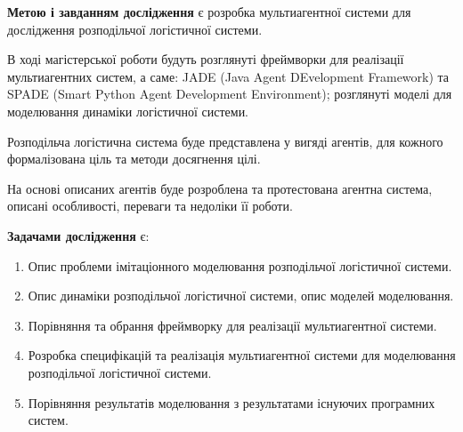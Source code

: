 \textbf{Метою і завданням дослідження} є розробка мультиагентної системи для дослідження розподільчої логістичної системи.

В ході магістерської роботи будуть розглянуті фреймворки для реалізації мультиагентних систем, а саме: JADE (Java Agent DEvelopment Framework) та SPADE (Smart Python Agent Development Environment); розглянуті моделі для моделювання динаміки логістичної системи.  

Розподільча логістична система буде представлена у вигяді агентів, для кожного формалізована ціль та методи досягнення цілі. 

На основі описаних агентів буде розроблена та протестована агентна система, описані особливості, переваги та недоліки її роботи. 

\textbf{Задачами дослідження} є:
\begin{enumerate}
	\item Опис проблеми імітаціонного моделювання розподільчої логістичної системи.
	\item Опис динаміки розподільчої логістичної системи, опис моделей моделювання.
	\item Порівняння та обрання фреймворку для реалізації мультиагентної системи.
	\item Розробка специфікацій та реалізація мультиагентної системи для моделювання розподільчої логістичної системи. 
	\item Порівняння результатів моделювання з результатами існуючих програмних систем.
\end{enumerate}


